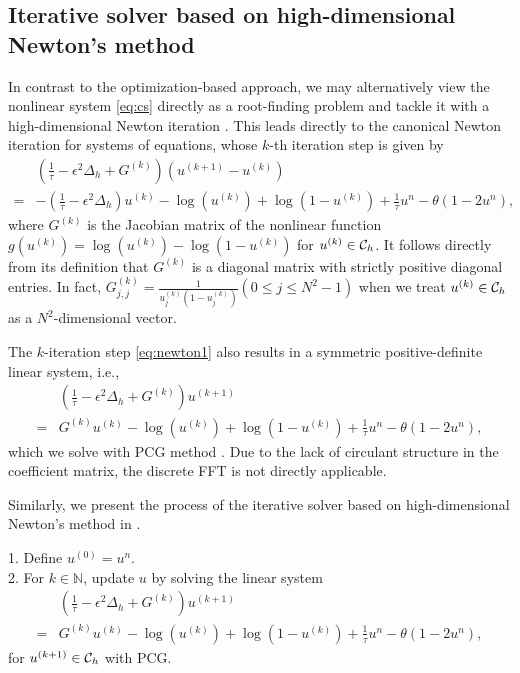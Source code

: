 \subsection{Iterative solver based on high-dimensional Newton's method}
In contrast to the optimization-based approach, we may alternatively view the nonlinear system \eqref{eq:cs} directly as a root-finding problem 
and tackle it with a high-dimensional Newton iteration \cite{ortega2000iterative}. 
This leads directly to the canonical Newton iteration for systems of equations, whose $k$-th iteration step is given by
\begin{equation}\label{eq:newton1}
    \begin{aligned}
    &(\frac{1}{\tau}-\epsilon^2\Delta_h+G^{(k)})(u^{(k+1)}-u^{(k)})\\
    =&-(\frac{1}{\tau}-\epsilon^2\Delta_h)u^{(k)}-\log(u^{(k)})
    +\log(1-u^{(k)})
    +\frac{1}{\tau}u^n-\theta(1-2u^n),
\end{aligned}
\end{equation}
where $G^{(k)}$ is the Jacobian matrix of the nonlinear function $g(u^{(k)})=\log(u^{(k)})-\log(1-u^{(k)})$ for $u^{(k)}\in {\mathcal{C}_h}$. 
It follows directly from its definition that $G^{(k)}$ is a diagonal matrix with strictly positive diagonal entries. 
In fact, $G^{(k)}_{j,j}=\frac{1}{u_{j}^{(k)}(1-u_{j}^{(k)})}(0\leq j \leq N^2-1)$ when we treat $u^{(k)} \in {\mathcal{C}_h}$ as a $N^2$-dimensional vector.
\par The $k$-iteration step \eqref{eq:newton1} also results in a symmetric positive-definite linear system, i.e.,
\begin{equation}
\begin{aligned}
    &(\frac{1}{\tau}-\epsilon^2\Delta_h+G^{(k)})u^{(k+1)}\\
    =&G^{(k)}u^{(k)}
    -\log(u^{(k)})
    +\log(1-u^{(k)})
    +\frac{1}{\tau}u^n-\theta(1-2u^n),
\end{aligned}
\end{equation}
which we solve with PCG method \cite{concus1976generalized}. Due to the lack of circulant structure in the coefficient matrix, the discrete FFT is not directly applicable. 
\par Similarly, we present the process of the iterative solver based on high-dimensional Newton's method in .

\begin{algorithm}[!t]
    \caption{Iterative solver based on high-dimensional Newton's method}
\label{alg:Newton}
    \raggedright
    1. Define $u^{(0)}=u^n$.\\
    2. For $k\in\mathbb{N}$, update $u$ by solving the linear system
    \begin{equation}
\begin{aligned}
    &(\frac{1}{\tau}-\epsilon^2\Delta_h+G^{(k)})u^{(k+1)}\\
    =&G^{(k)}u^{(k)}
    -\log(u^{(k)})
    +\log(1-u^{(k)})
    +\frac{1}{\tau}u^n-\theta(1-2u^n),
\end{aligned}
\end{equation}
    \hspace{10pt} for $u^{(k+1)}\in{\mathcal{C}_h}$ with PCG.\\
    
\end{algorithm}
    